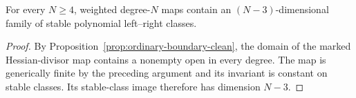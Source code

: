 \fi

\ifdefined\HurwitzLLPaper
\else

\begin{corollary}
\label{cor:weighted-stable-moduli}
For every $N\ge4$, weighted degree-$N$ maps contain an
$(N-3)$-dimensional family of stable polynomial left--right classes.
\end{corollary}

\begin{proof}
By Proposition~\ref{prop:ordinary-boundary-clean}, the domain of the marked
Hessian-divisor map contains a nonempty open in every degree.
The map is generically finite by the preceding argument and its invariant is
constant on stable classes.  Its stable-class image therefore has dimension
$N-3$.
\end{proof}

\fi
